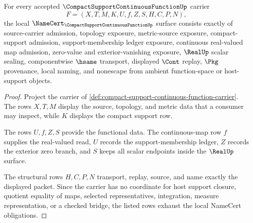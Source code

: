 \begin{theorem}
\label{thm:compact-support-continuous-function-namecert-obligations}
For every accepted $\CompactSupportContinuousFunctionUp$ carrier
$$
F=(X,T,M,K,U,f,Z,S,H,C,P,N),
$$
the local $\NameCert_{\CompactSupportContinuousFunctionUp}$ surface consists exactly of source-carrier admission, topology exposure, metric-source exposure, compact-support admission, support-membership ledger exposure, continuous real-valued map admission, zero-value and exterior-vanishing exposure, $\RealUp$ scalar sealing, componentwise $\hsame$ transport, displayed $\Cont$ replay, $\Pkg$ provenance, local naming, and nonescape from ambient function-space or host-support objects.
\end{theorem}
\begin{proof}
Project the carrier of \autoref{def:compact-support-continuous-function-carrier}. The rows $X,T,M$ display the source, topology, and metric data that a consumer may inspect, while $K$ displays the compact support row.

The rows $U,f,Z,S$ provide the functional data. The continuous-map row $f$ supplies the real-valued read, $U$ records the support-membership ledger, $Z$ records the exterior zero branch, and $S$ keeps all scalar endpoints inside the $\RealUp$ surface.

The structural rows $H,C,P,N$ transport, replay, source, and name exactly the displayed packet. Since the carrier has no coordinate for host support closure, quotient equality of maps, selected representatives, integration, measure representation, or a checked bridge, the listed rows exhaust the local NameCert obligations.
\end{proof}

